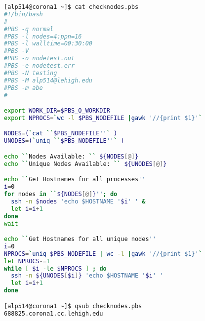 \documentclass[10pt,t]{beamer}
\begin{document}
\begin{frame}[fragile]
  \begin{lstlisting}[language=bash]
[alp514@corona1 ~]$ cat checknodes.pbs 
#!/bin/bash
#
#PBS -q normal
#PBS -l nodes=4:ppn=16
#PBS -l walltime=00:30:00
#PBS -V
#PBS -o nodetest.out
#PBS -e nodetest.err
#PBS -N testing
#PBS -M alp514@lehigh.edu
#PBS -m abe
#

export WORK_DIR=$PBS_O_WORKDIR
export NPROCS=`wc -l $PBS_NODEFILE |gawk '//{print $1}'`

NODES=(`cat ``$PBS_NODEFILE''` )
UNODES=(`uniq ``$PBS_NODEFILE''` )

echo ``Nodes Available: `` ${NODES[@]}
echo ``Unique Nodes Available: `` ${UNODES[@]}

echo ``Get Hostnames for all processes''
i=0
for nodes in ``${NODES[@]}''; do
  ssh -n $nodes 'echo $HOSTNAME '$i' ' &
  let i=i+1
done
wait

echo ``Get Hostnames for all unique nodes''
i=0
NPROCS=`uniq $PBS_NODEFILE | wc -l |gawk '//{print $1}'`
let NPROCS-=1
while [ $i -le $NPROCS ] ; do
  ssh -n ${UNODES[$i]} 'echo $HOSTNAME '$i' '
  let i=i+1
done

[alp514@corona1 ~]$ qsub checknodes.pbs
688825.corona1.cc.lehigh.edu
  \end{lstlisting}
\end{frame}
\end{document}
